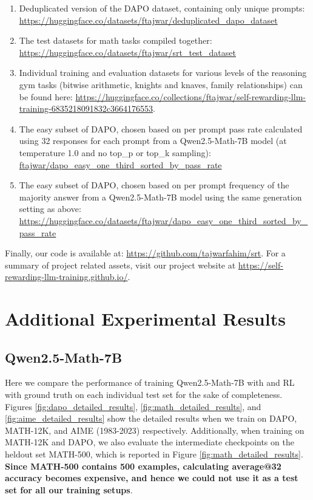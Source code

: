 \begin{enumerate}
    \item Deduplicated version of the DAPO dataset, containing only unique prompts: \url{https://huggingface.co/datasets/ftajwar/deduplicated_dapo_dataset}

    \item The test datasets for math tasks compiled together: \url{https://huggingface.co/datasets/ftajwar/srt_test_dataset}

    \item Individual training and evaluation datasets for various levels of the reasoning gym tasks (bitwise arithmetic, knights and knaves, family relationships) can be found here: \url{https://huggingface.co/collections/ftajwar/self-rewarding-llm-training-6835218091832c3664176553}.

    \item The easy subset of DAPO, chosen based on per prompt pass rate calculated using 32 responses for each prompt from a Qwen2.5-Math-7B model (at temperature 1.0 and no top\_p or top\_k sampling): \url{ftajwar/dapo_easy_one_third_sorted_by_pass_rate}

    \item The easy subset of DAPO, chosen based on per prompt frequency of the majority answer from a Qwen2.5-Math-7B model using the same generation setting as above: \url{https://huggingface.co/datasets/ftajwar/dapo_easy_one_third_sorted_by_pass_rate}
\end{enumerate}

Finally, our code is available at: \url{https://github.com/tajwarfahim/srt}. For a summary of project related assets, visit our project website at \url{https://self-rewarding-llm-training.github.io/}.

\newpage

\section{Additional Experimental Results}
\label{app:additional_experimental_results}

\subsection{Qwen2.5-Math-7B}
\label{app:qwen2.5_math_7b_full_results}

Here we compare the performance of training Qwen2.5-Math-7B with \algo{} and RL with ground truth on each individual test set for the sake of completeness. Figures \ref{fig:dapo_detailed_results}, \ref{fig:math_detailed_results}, and \ref{fig:aime_detailed_results} show the detailed results when we train on DAPO, MATH-12K, and AIME (1983-2023) respectively. Additionally, when training on MATH-12K and DAPO, we also evaluate the intermediate checkpoints on the heldout set MATH-500, which is reported in Figure \ref{fig:math_detailed_results}. \textbf{Since MATH-500 contains 500 examples, calculating average@32 accuracy becomes expensive, and hence we could not use it as a test set for all our training setups}.


